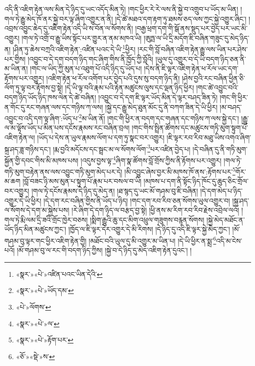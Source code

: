 འདི་ནི་འཇིག་རྟེན་ལས་མིན་དེ་ཉིད་དུ་ཡང་འདོད་མིན་ཏེ། །གང་ཕྱིར་རེ་རེ་ལས་ནི་སྐྱེ་བ་འགྲུབ་པ་ཡོད་མ་ཡིན། །གལ་ཏེ་རྒྱུ་མེད་ཁོ་ནར་སྐྱེ་བར་ལྟ་ཞིག་འགྱུར་ན་ནི། །དེ་ཚེ་མཐའ་དག་རྟག་ཏུ་ཐམས་ཅད་ལས་ཀྱང་སྐྱེ་འགྱུར་ཞིང་། །འབྲས་འབྱུང་ཆེད་དུ་འཇིག་རྟེན་འདི་ཡི་ས་བོན་ལ་སོགས་ནི། །བརྒྱ་ཕྲག་དག་གི་སྒོ་ནས་སྡུད་པར་བྱེད་པར་ཡང་མི་འགྱུར། །གལ་ཏེ་འགྲོ་བ་རྒྱུ་ཡིས་སྟོང་པར་གྱུར་ན་ནམ་མཁའ་ཡི། །ཨུཏྤ་ལ་ཡི་དྲི་མདོག་ཇི་བཞིན་གཟུང་དུ་མེད་ཉིད་ན། །ཤིན་ཏུ་ཆེས་བཀྲའི་འཇིག་རྟེན་:འཛིན་པའང་དེ་ཡི་\footnote{«སྣར་»«པེ་»འཛིན་པའང་ཡིན་དེའི་}ཕྱིར། །རང་གི་བློ་བཞིན་འཇིག་རྟེན་རྒྱུ་ལས་ཡིན་པར་ཤེས་པར་གྱིས། །འབྱུང་བ་དེ་དག་བདག་ཉིད་གང་ཞིག་གིས་ནི་ཁྱོད་ཀྱི་བློའི། །ཡུལ་དུ་འགྱུར་བ་དེ་ཡི་བདག་ཉིད་ཅན་ནི་མ་ཡིན་ན། །གང་ལ་ཡིད་ཀྱི་མུན་པ་འཐུག་པོ་འདི་ཉིད་དུ་ཡོད་པ། །དེས་ནི་ཇི་ལྟར་འཇིག་རྟེན་ཕ་རོལ་ཡང་དག་རྟོགས་པར་འགྱུར། །འཇིག་རྟེན་ཕ་རོལ་འགོག་པར་བྱེད་པའི་དུས་སུ་བདག་ཉིད་ནི། །ཤེས་བྱའི་རང་བཞིན་ཕྱིན་ཅི་ལོག་ཏུ་ལྟ་བར་རྟོགས་བྱ་སྟེ། །དེ་ཡི་ལྟ་བའི་རྣམ་པའི་རྟེན་མཚུངས་ལུས་དང་ལྡན་ཉིད་ཕྱིར། །གང་ཚེ་འབྱུང་བའི་བདག་ཉིད་ཡོད་ཉིད་ཁས་ལེན་དེ་ཚེ་བཞིན། །འབྱུང་བ་དེ་དག་ཇི་ལྟར་ཡོད་མིན་དེ་ལྟར་བཤད་ཟིན་ཏེ། །གང་གི་ཕྱིར་ན་གོང་དུ་རང་གཞན་ལས་དང་གཉིས་ཀ་ལས། །སྐྱེ་དང་རྒྱུ་མེད་ཐུན་མོང་དུ་ནི་བཀག་ཟིན་དེ་ཡི་ཕྱིར། །མ་བཤད་འབྱུང་བ་འདི་དག་ལྟ་ཞིག་:ཡོད་པ་\footnote{«སྣར་»«པེ་»ཡོད་དམ་}མ་ཡིན་ནོ། །གང་གི་ཕྱིར་ན་བདག་དང་གཞན་དང་གཉིས་ཀ་ལས་སྐྱེ་དང་། །རྒྱུ་ལ་མ་ལྟོས་ཡོད་པ་མིན་པས་དངོས་རྣམས་རང་བཞིན་བྲལ། །གང་གིས་སྤྲིན་ཚོགས་དང་མཚུངས་གཏི་མུག་སྟུག་པོ་འཇིག་རྟེན་ལ། །ཡོད་པ་དེས་ན་ཡུལ་རྣམས་ལོག་པ་དག་ཏུ་སྣང་བར་འགྱུར། །ཇི་ལྟར་རབ་རིབ་མཐུ་ཡིས་འགའ་ཞིག་སྐྲ་ཤད་ཟླ་གཉིས་དང་། །རྨ་བྱའི་མདོངས་དང་སྦྲང་མ་ལ་སོགས་ལོག་\footnote{«པེ་»ལོགས་}པར་འཛིན་བྱེད་པ། །དེ་བཞིན་དུ་ནི་གཏི་མུག་སྐྱོན་གྱི་དབང་གིས་མི་མཁས་པས། །འདུས་བྱས་ལྟ་\footnote{«སྣར་»«པེ་»ལ་}ཞིག་སྣ་ཚོགས་བློ་གྲོས་ཀྱིས་ནི་རྟོགས་པར་འགྱུར། །གལ་ཏེ་གཏི་མུག་བརྟེན་ནས་ལས་འབྱུང་གཏི་མུག་མེད་པར་དེ། །མི་འབྱུང་ཞེས་བྱར་མི་མཁས་ཁོ་ནས་:རྟོགས་པར་\footnote{«སྣར་»«པེ་»རྟོག་པར་}གོར་མ་ཆག །བློ་བཟང་ཉི་མས་མུན་པ་སྟུག་པོ་རྣམ་པར་བསལ་བ་ཡི། །མཁས་པ་དག་ནི་སྟོང་ཉིད་ཁོང་དུ་ཆུད་ཅིང་གྲོལ་བར་འགྱུར། །གལ་ཏེ་དངོས་རྣམས་དེ་ཉིད་དུ་མེད་ན། །ཐ་སྙད་དུ་ཡང་མོ་གཤམ་བུ་ཇི་བཞིན། །དེ་དག་མེད་པ་ཉིད་འགྱུར་དེ་ཡི་ཕྱིར། །དེ་དག་རང་བཞིན་གྱིས་ནི་ཡོད་པ་ཉིད། །གང་དག་རབ་རིབ་ཅན་སོགས་ཡུལ་འགྱུར་བ། །སྐྲ་ཤད་ལ་སོགས་དེ་དག་མ་སྐྱེས་པས། །རེ་ཞིག་དེ་དག་ཉིད་ལ་བརྩད་བྱ་སྟེ། །ཕྱི་ནས་མ་རིག་རབ་རིབ་རྗེས་འབྲེལ་ལའོ། །གལ་ཏེ་རྨི་ལམ་དྲི་ཟའི་གྲོང་ཁྱེར་བཅས། །སྨིག་རྒྱུའི་ཆུ་དང་མིག་འཕྲུལ་གཟུགས་བརྙན་སོགས། །སྐྱེ་མེད་མཐོང་ན་ཡོད་ཉིད་མིན་མཚུངས་ཀྱང་། །ཁྱོད་ལ་ཇི་ལྟར་དེར་འགྱུར་དེ་མི་རིགས། །དེ་ཉིད་དུ་འདི་ཇི་ལྟར་སྐྱེ་མེད་ཀྱང་། །མོ་གཤམ་བུ་ལྟར་གང་ཕྱིར་འཇིག་རྟེན་གྱི། །མཐོང་བའི་ཡུལ་དུ་མི་འགྱུར་མ་ཡིན་པ། །དེ་ཡི་ཕྱིར་ན་སྨྲ་\footnote{«ཅོ་»«སྡེ་»ས་}འདི་མ་ངེས་པའོ། །མོ་གཤམ་བུ་ལ་རང་གི་བདག་ཉིད་ཀྱིས། །སྐྱེ་བ་དེ་ཉིད་དུ་མེད་འཇིག་རྟེན་དུའང་། །

